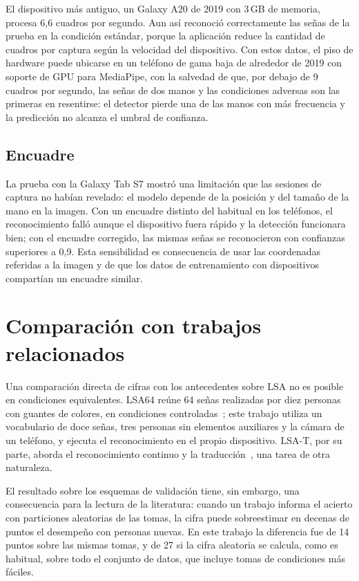 El dispositivo más antiguo, un Galaxy A20 de 2019 con 3\,GB de memoria, procesa 6,6 cuadros por segundo. Aun así reconoció correctamente las señas de la prueba en la condición estándar, porque la aplicación reduce la cantidad de cuadros por captura según la velocidad del dispositivo. Con estos datos, el piso de hardware puede ubicarse en un teléfono de gama baja de alrededor de 2019 con soporte de GPU para MediaPipe, con la salvedad de que, por debajo de 9 cuadros por segundo, las señas de dos manos y las condiciones adversas son las primeras en resentirse: el detector pierde una de las manos con más frecuencia y la predicción no alcanza el umbral de confianza.

\subsection{Encuadre}

La prueba con la Galaxy Tab S7 mostró una limitación que las sesiones de captura no habían revelado: el modelo depende de la posición y del tamaño de la mano en la imagen. Con un encuadre distinto del habitual en los teléfonos, el reconocimiento falló aunque el dispositivo fuera rápido y la detección funcionara bien; con el encuadre corregido, las mismas señas se reconocieron con confianzas superiores a 0,9. Esta sensibilidad es consecuencia de usar las coordenadas referidas a la imagen y de que los datos de entrenamiento con dispositivos compartían un encuadre similar.

\section{Comparación con trabajos relacionados}

Una comparación directa de cifras con los antecedentes sobre LSA no es posible en condiciones equivalentes. LSA64 reúne 64 señas realizadas por diez personas con guantes de colores, en condiciones controladas~\cite{ronchetti2016lsa64}; este trabajo utiliza un vocabulario de doce señas, tres personas sin elementos auxiliares y la cámara de un teléfono, y ejecuta el reconocimiento en el propio dispositivo. LSA-T, por su parte, aborda el reconocimiento continuo y la traducción~\cite{dalbianco2022lsat}, una tarea de otra naturaleza.

El resultado sobre los esquemas de validación tiene, sin embargo, una consecuencia para la lectura de la literatura: cuando un trabajo informa el acierto con particiones aleatorias de las tomas, la cifra puede sobreestimar en decenas de puntos el desempeño con personas nuevas. En este trabajo la diferencia fue de 14 puntos sobre las mismas tomas, y de 27 si la cifra aleatoria se calcula, como es habitual, sobre todo el conjunto de datos, que incluye tomas de condiciones más fáciles.

